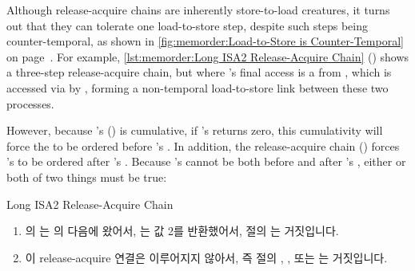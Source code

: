 Although release-acquire chains are inherently store-to-load creatures,
it turns out that they can tolerate one load-to-store step, despite
such steps being counter-temporal, as shown in
\cref{fig:memorder:Load-to-Store is Counter-Temporal}
on
page~\pageref{fig:memorder:Load-to-Store is Counter-Temporal}.
For example,
\cref{lst:memorder:Long ISA2 Release-Acquire Chain}
()
shows a three-step release-acquire chain, but where 's
final access is a  from , which is
accessed via  by , forming a non-temporal
load-to-store link between these two processes.
\begin{fcvref}
However, because 's  ()
is cumulative, if 's  returns zero,
this cumulativity will force the  to be ordered
before 's .
In addition, the release-acquire chain
()
forces 's  to be ordered after 's
.
Because 's  cannot be both before and after
's , either or both of two things must
be true:
\end{fcvref}

\fi

\begin{listing}[tbp]

\caption{Long ISA2 Release-Acquire Chain}
\label{lst:memorder:Long ISA2 Release-Acquire Chain}
\end{listing}

\begin{enumerate}
\item	{} 의  는  의  다음에
	왔어서,  는 값 2를 반환했어서,  절의
	 는 거짓입니다.
\item	이 release-acquire 연결은 이루어지지 않아서, 즉  절의
	, , 또는  는 거짓입니다.

\end{enumerate}


